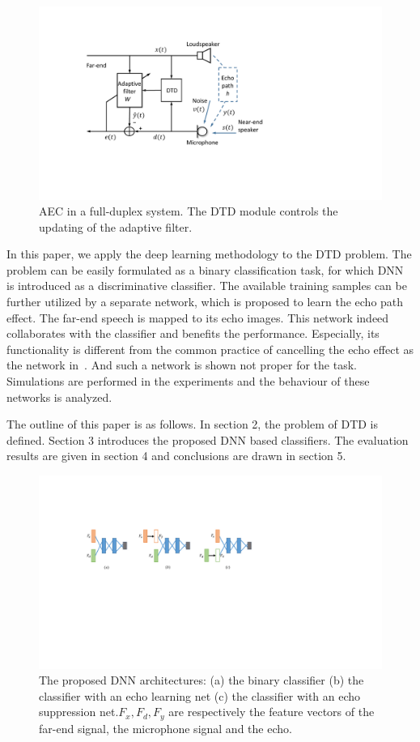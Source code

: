 \documentclass[a4paper]{article}
\begin{document}
\begin{figure}[t]
  \centering
  \includegraphics[width=0.95\linewidth]{fig1_aec.pdf}
  \caption{AEC in a full-duplex system. The DTD module controls the updating of the adaptive filter.}
  \label{fig1}
\end{figure}

In this paper, we apply the deep learning methodology to the DTD problem. The problem can be easily formulated as a binary classification task, for which DNN is introduced as a discriminative classifier. The available training samples can be further utilized by a separate network, which is proposed to learn the echo path effect. The far-end speech is mapped to its echo images. This network indeed collaborates with the classifier and benefits the performance. Especially, its functionality is different from the common practice of cancelling the echo effect as the network in~\cite{lee2015dnn}. And such a network is shown not proper for the task. Simulations are performed in the experiments and the behaviour of these networks is analyzed.

The outline of this paper is as follows. In section 2, the problem of DTD is defined. Section 3 introduces the proposed DNN based classifiers. The evaluation results are given in section 4 and conclusions are drawn in section 5.

\begin{figure}[t]
  \centering
  \includegraphics[width=0.9\linewidth]{fig2_nn.pdf}
  \caption{The proposed DNN architectures: (a) the binary classifier (b) the classifier with an echo learning net (c) the classifier with an echo suppression net.$F_x,F_d,F_y$ are respectively the feature vectors of the far-end signal, the microphone signal and the echo.}
  \label{fig2}
\end{figure}
\end{document}
